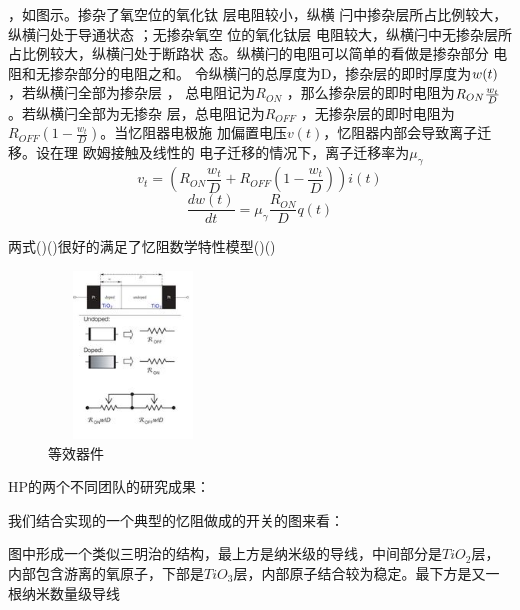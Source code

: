 \documentclass[UTF8]{article}
\begin{document}
，如图示。掺杂了氧空位的氧化钛 层电阻较小，纵横 闩中掺杂层所占比例较大，纵横闩处于导通状态 ；无掺杂氧空 位的氧化钛层 电阻较大，纵横闩中无掺杂层所 占比例较大，纵横闩处于断路状 态。纵横闩的电阻可以简单的看做是掺杂部分 电阻和无掺杂部分的电阻之和。 令纵横闩的总厚度为D，掺杂层的即时厚度为$\mathnormal{w(t)}   $，若纵横闩全部为掺杂层 ， 总电阻记为$R_{ON}$ ，那么掺杂层的即时电阻为$R_{ON} \frac{\mathnormal{w_{t}}}{\mathnormal{D}}$。若纵横闩全部为无掺杂 层，总电阻记为$R_{OFF}$ ，无掺杂层的即时电阻为$R_{OFF}(1 - \frac{w_{t}}{D})$。当忆阻器电极施 加偏置电压$v(t)$，忆阻器内部会导致离子迁移。设在理 欧姆接触及线性的 电子迁移的情况下，离子迁移率为$\mu_{\gamma}$
\begin{equation}
v_{t} = (R_{ON} \frac{w_{t}}{D} + R_{OFF}(1 - \frac{w_{t}}{D}) ) i(t)
\end{equation}
\begin{equation}
\frac{dw(t)}{dt} = \mu_{\gamma}\frac{R_{ON}}{D}q(t)
\end{equation}

两式()()很好的满足了忆阻数学特性模型()()

\begin{figure}[htbp]
\centering
\includegraphics[width=1.77in,height=1.75in]{pic/no2.jpeg}

\caption{等效器件}
\label{fig:graph}
\end{figure}




HP的两个不同团队的研究成果：


%
我们结合实现的一个典型的忆阻做成的开关的图来看：

图中形成一个类似三明治的结构，最上方是纳米级的导线，中间部分是$TiO_{2}$层，内部包含游离的氧原子，下部是$TiO_{3}$层，内部原子结合较为稳定。最下方是又一根纳米数量级导线
\end{document}
